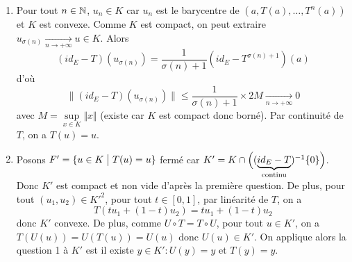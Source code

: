 \begin{solution}
	\phantom{}
	\begin{enumerate}
		\item Pour tout $n\in\mathbb{N}$, $u_{n}\in K$ car $u_{n}$ est le barycentre de $(a,T(a),\dots,T^{n}(a))$ et $K$ est convexe. Comme $K$ est compact, on peut extraire $u_{\sigma(n)}\xrightarrow[n\to+\infty]{}u\in K$. Alors
		$$(id_{E}-T)(u_{\sigma(n)})=\frac{1}{\sigma(n)+1}(id_{E}-T^{\sigma(n)+1})(a)$$
		d'où 
		$$\rVert(id_{E}-T)(u_{\sigma(n)})\lVert\leqslant\frac{1}{\sigma(n)+1}\times 2M\xrightarrow[n\to+\infty]{}0$$
		avec $M=\sup\limits_{x\in K}\Vert x\Vert$ (existe car $K$ est compact donc borné). Par continuité de $T$, on a $T(u)=u$.

		\item Posons $F'=\{u\in K\bigm| T(u)=u\}$ fermé car $K'=K\cap\Bigl((\underbrace{id_{E}-T}_{\text{continu}})^{-1}\{0\}\Bigr)$.
		Donc $K'$ est compact et non vide d'après la première question. De plus, pour tout $(u_{1},u_{2})\in K'^{2}$, pour tout $t\in[0,1]$, par linéarité de $T$, on a 
		$$T(tu_{1}+(1-t)u_{2})=tu_{1}+(1-t)u_{2}$$
		donc $K'$ convexe. De plus, comme $U\circ T=T\circ U$, pour tout $u\in K'$, on a $T(U(u))=U(T(u))=U(u)$ donc $U(u)\in K'$. On applique alors la question 1 à $K'$ est il existe $y\in K'\colon U(y)=y$ et $T(y)=y$.
	\end{enumerate}
\end{solution}

